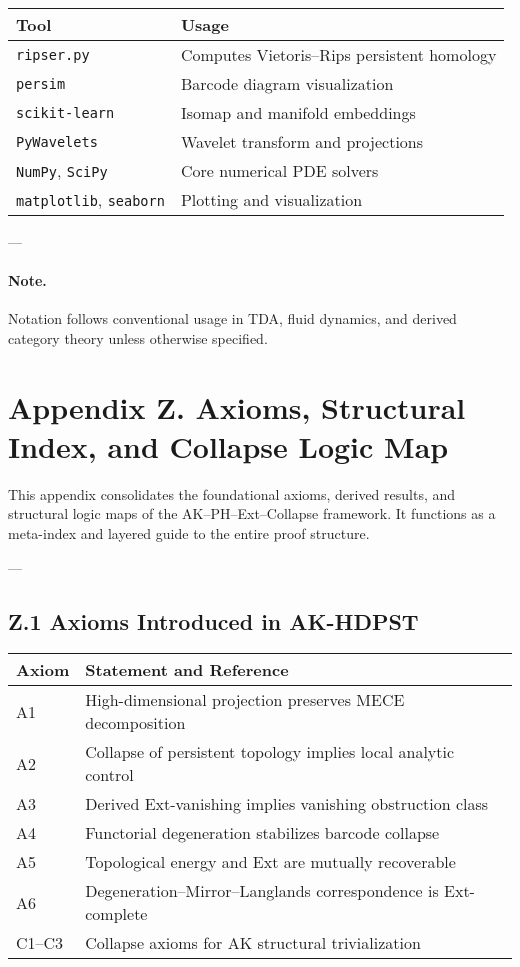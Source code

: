 \documentclass[11pt]{article}
\theoremstyle{definition}
\begin{document}
\begin{tabular}{ll}
\textbf{Tool} & \textbf{Usage} \\
\hline
\texttt{ripser.py} & Computes Vietoris–Rips persistent homology \\
\texttt{persim} & Barcode diagram visualization \\
\texttt{scikit-learn} & Isomap and manifold embeddings \\
\texttt{PyWavelets} & Wavelet transform and projections \\
\texttt{NumPy}, \texttt{SciPy} & Core numerical PDE solvers \\
\texttt{matplotlib}, \texttt{seaborn} & Plotting and visualization \\
\end{tabular}

---

\paragraph{Note.} Notation follows conventional usage in TDA, fluid dynamics, and derived category theory unless otherwise specified.


\section*{Appendix Z. Axioms, Structural Index, and Collapse Logic Map}

This appendix consolidates the foundational axioms, derived results, and structural logic maps of the AK–PH–Ext–Collapse framework.  
It functions as a meta-index and layered guide to the entire proof structure.

---

\subsection*{Z.1 Axioms Introduced in AK-HDPST}

\begin{tabular}{ll}
\textbf{Axiom} & \textbf{Statement and Reference} \\
\hline
A1 & High-dimensional projection preserves MECE decomposition \quad [Sec. 2.1] \\
A2 & Collapse of persistent topology implies local analytic control \quad [Steps 1–3] \\
A3 & Derived Ext-vanishing implies vanishing obstruction class \quad [Appendix G] \\
A4 & Functorial degeneration stabilizes barcode collapse \quad [Appendix H] \\
A5 & Topological energy and Ext are mutually recoverable \quad [Appendix C, I] \\
A6 & Degeneration–Mirror–Langlands correspondence is Ext-complete \quad [Appendix I.13] \\
C1–C3 & Collapse axioms for AK structural trivialization \quad [Appendix J] \\
\end{tabular}
\end{document}

